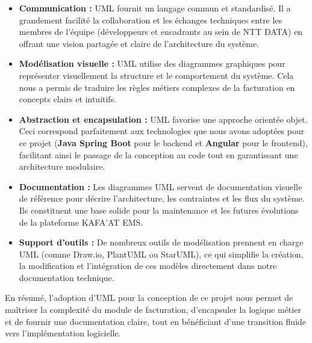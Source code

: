 \documentclass[12pt, a4paper, openany]{report}
\begin{document}
\begin{itemize}[leftmargin=*, itemsep=0.3cm]
    \item \textcolor{primaryBlue}{\textbf{Communication :}} UML fournit un langage commun et standardisé. Il a grandement facilité la collaboration et les échanges techniques entre les membres de l'équipe (développeurs et encadrants au sein de NTT DATA) en offrant une vision partagée et claire de l'architecture du système.
    
    \vspace{-0.4cm}
    \item \textcolor{primaryBlue}{\textbf{Modélisation visuelle :}} UML utilise des diagrammes graphiques pour représenter visuellement la structure et le comportement du système. Cela nous a permis de traduire les règles métiers complexes de la facturation en concepts clairs et intuitifs.
    
    \vspace{-0.4cm}
    \item \textcolor{primaryBlue}{\textbf{Abstraction et encapsulation :}} UML favorise une approche orientée objet. Ceci correspond parfaitement aux technologies que nous avons adoptées pour ce projet (\textbf{Java Spring Boot} pour le backend et \textbf{Angular} pour le frontend), facilitant ainsi le passage de la conception au code tout en garantissant une architecture modulaire.
    
    \vspace{-0.4cm}
    \item \textcolor{primaryBlue}{\textbf{Documentation :}} Les diagrammes UML servent de documentation visuelle de référence pour décrire l'architecture, les contraintes et les flux du système. Ils constituent une base solide pour la maintenance et les futures évolutions de la plateforme KAFA'AT EMS.
    
    \vspace{-0.4cm}
    \item \textcolor{primaryBlue}{\textbf{Support d'outils :}} De nombreux outils de modélisation prennent en charge UML (comme Draw.io, PlantUML ou StarUML), ce qui simplifie la création, la modification et l'intégration de ces modèles directement dans notre documentation technique.
\end{itemize}

\vspace{-0.4cm}
En résumé, l'adoption d'UML pour la conception de ce projet nous permet de maîtriser la complexité du module de facturation, d'encapsuler la logique métier et de fournir une documentation claire, tout en bénéficiant d'une transition fluide vers l'implémentation logicielle. \cite{uml_ibm}
\end{document}
